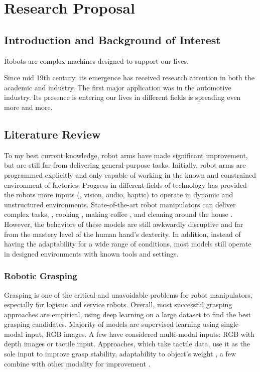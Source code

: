 \chapter{Research Proposal}

\section{Introduction and Background of Interest}


Robots are complex machines designed to support our lives.

Since mid 19th century, its emergence has received research attention in both the academic and industry. The first major application was in the automotive industry. Its presence is entering our lives in different fields is spreading even more and more. 

\section{Literature Review}

To my best current knowledge, robot arms have made significant improvement, but are still far from delivering general-purpose tasks. Initially, robot arms are programmed explicitly and only capable of working in the known and constrained environment of factories. Progress in different fields of technology has provided the robots more inputs (\eg, vision, audio, haptic) to operate in dynamic and unstructured environments. State-of-the-art robot manipulators can deliver complex tasks, \eg, cooking \cite{moley}, making coffee \cite{coffeemaster}, and cleaning around the house \cite{bothandy}. However, the behaviors of these models are still awkwardly disruptive and far from the mastery level of the human hand's dexterity. In addition, instead of having the adaptability for a wide range of conditions, most models still operate in designed environments with known tools and settings.

\subsection{Robotic Grasping}

Grasping is one of the critical and unavoidable problems for robot manipulators, especially for logistic and service robots. Overall, most successful grasping approaches are empirical, using deep learning on a large dataset to find the best grasping candidates. Majority of models are supervised learning using single-modal input, \ie RGB images. A few have considered multi-modal inputs: RGB with depth images or tactile input. Approaches, which take tactile data, use it as the sole input to improve grasp stability, adaptability to object's weight \cite{bekiroglu2011assessing, li2014learning}, a few combine with other modality for improvement \cite{calandra2017feeling}. \cite{bohg2013data, caldera2018review, li2019review, kleeberger2020survey}

